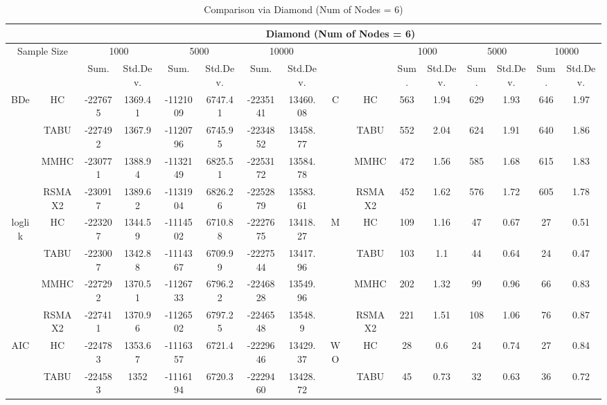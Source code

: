 \begin{table}[p]																										
\centering	\caption{Comparison via Diamond (Num of Nodes = 6)}	\tiny																						
{\tabcolsep=0.01in																										
\begin{tabular}{cc||cc|cc|cc||cc|cc|cc|cc}																										
\hline																										
&	&	\multicolumn{14}{c}{Diamond	(Num	of	Nodes	=	6)}\tabularnewline																			
\hline																										
\multicolumn{2}{c||}{Sample	Size}	&	\multicolumn{2}{c|}{1000}	&	\multicolumn{2}{c|}{5000}	&	\multicolumn{2}{c||}{10000}	&	&	&	\multicolumn{2}{c|}{1000}	&	\multicolumn{2}{c|}{5000}	&	\multicolumn{2}{c}{10000}\tabularnewline											
\hline																										
&	&	Sum.	&	Std.Dev.	&	Sum.	&	Std.Dev.	&	Sum.	&	Std.Dev.	&	&	&	Sum.	&	Std.Dev.	&	Sum.	&	Std.Dev.	&	Sum.	&	Std.Dev.\tabularnewline
\hline																										
\hline																										
\multirow{4}{*}{BDe} & HC &	-227675 & 	1369.41 & 	-1121009 & 	6747.41 & 	-2235141 & 	13460.08 & 	\multirow{4}{*}{C} & HC &	563 & 	1.94 & 	629 & 	1.93 & 	646 & 	1.97\tabularnewline													
& TABU &	-227492 & 	1367.9 & 	-1120796 & 	6745.95 & 	-2234852 & 	13458.77 & 	& TABU &	552 & 	2.04 & 	624 & 	1.91 & 	640 & 	1.86\tabularnewline													
& MMHC &	-230771 & 	1388.94 & 	-1132149 & 	6825.51 & 	-2253172 & 	13584.78 & 	& MMHC &	472 & 	1.56 & 	585 & 	1.68 & 	615 & 	1.83\tabularnewline													
& RSMAX2 &	-230917 & 	1389.62 & 	-1131904 & 	6826.26 & 	-2252879 & 	13583.61 & 	& RSMAX2 &	452 & 	1.62 & 	576 & 	1.72 & 	605 & 	1.78\tabularnewline													
\hline																										
\multirow{4}{*}{loglik} & HC &	-223207 & 	1344.59 & 	-1114502 & 	6710.88 & 	-2227675 & 	13418.27 & 	\multirow{4}{*}{M} & HC &	109 & 	1.16 & 	47 & 	0.67 & 	27 & 	0.51\tabularnewline													
& TABU &	-223007 & 	1342.88 & 	-1114367 & 	6709.99 & 	-2227544 & 	13417.96 & 	& TABU &	103 & 	1.1 & 	44 & 	0.64 & 	24 & 	0.47\tabularnewline													
& MMHC &	-227292 & 	1370.51 & 	-1126733 & 	6796.22 & 	-2246828 & 	13549.96 & 	& MMHC &	202 & 	1.32 & 	99 & 	0.96 & 	66 & 	0.83\tabularnewline													
& RSMAX2 &	-227411 & 	1370.96 & 	-1126502 & 	6797.25 & 	-2246548 & 	13548.9 & 	& RSMAX2 &	221 & 	1.51 & 	108 & 	1.06 & 	76 & 	0.87\tabularnewline													
\hline																										
\multirow{4}{*}{AIC} & HC &	-224783 & 	1353.67 & 	-1116357 & 	6721.4 & 	-2229646 & 	13429.37 & 	\multirow{4}{*}{WO} & HC &	28 & 	0.6 & 	24 & 	0.74 & 	27 & 	0.84\tabularnewline													
& TABU &	-224583 & 	1352 & 	-1116194 & 	6720.3 & 	-2229460 & 	13428.72 & 	& TABU &	45 & 	0.73 & 	32 & 	0.63 & 	36 & 	0.72\tabularnewline													

\end{tabular}}
\end{table}
